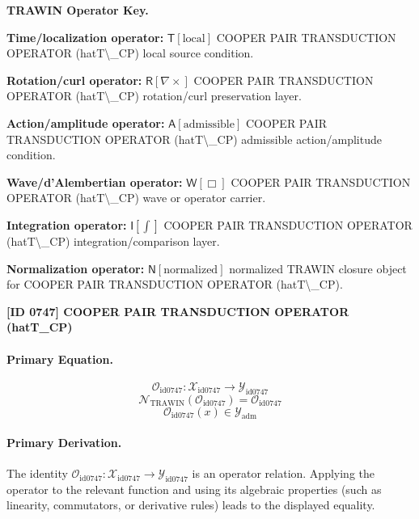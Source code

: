 \par\vspace{0.45\baselineskip}
\noindent\begin{minipage}[t]{\linewidth}
\begingroup
\small
\raggedright
\textbf{TRAWIN Operator Key.}\par
\noindent\textbf{Time/localization operator:} $\mathsf{T}\!\left[\mathrm{local}\right]$ COOPER PAIR TRANSDUCTION OPERATOR (hatT\textbackslash{}\_CP) local source condition.\par
\noindent\textbf{Rotation/curl operator:} $\mathsf{R}\!\left[\nabla\times\right]$ COOPER PAIR TRANSDUCTION OPERATOR (hatT\textbackslash{}\_CP) rotation/curl preservation layer.\par
\noindent\textbf{Action/amplitude operator:} $\mathsf{A}\!\left[\mathrm{admissible}\right]$ COOPER PAIR TRANSDUCTION OPERATOR (hatT\textbackslash{}\_CP) admissible action/amplitude condition.\par
\noindent\textbf{Wave/d'Alembertian operator:} $\mathsf{W}\!\left[\Box\right]$ COOPER PAIR TRANSDUCTION OPERATOR (hatT\textbackslash{}\_CP) wave or operator carrier.\par
\noindent\textbf{Integration operator:} $\mathsf{I}\!\left[\int\right]$ COOPER PAIR TRANSDUCTION OPERATOR (hatT\textbackslash{}\_CP) integration/comparison layer.\par
\noindent\textbf{Normalization operator:} $\mathsf{N}\!\left[\mathrm{normalized}\right]$ normalized TRAWIN closure object for COOPER PAIR TRANSDUCTION OPERATOR (hatT\textbackslash{}\_CP).\par
\endgroup
\end{minipage}

\clearpage
\noindent\textbf{[ID 0747] COOPER PAIR TRANSDUCTION OPERATOR (hatT\_CP)}\par
\vspace{0.35em}
\paragraph{Primary Equation.}
\[
\mathcal{O}_{\mathrm{id0747}}:\mathcal{X}_{\mathrm{id0747}}\longrightarrow\mathcal{Y}_{\mathrm{id0747}}
\]
\[
\mathcal{N}_{\mathrm{TRAWIN}}(\mathcal{O}_{\mathrm{id0747}})=\mathcal{O}_{\mathrm{id0747}}
\]
\[
\mathcal{O}_{\mathrm{id0747}}(x)\in\mathcal{Y}_{\mathrm{adm}}
\]

\paragraph{Primary Derivation.}
The identity \( \mathcal{O}_{\mathrm{id0747}}:\mathcal{X}_{\mathrm{id0747}}\longrightarrow\mathcal{Y}_{\mathrm{id0747}} \) is an operator relation. Applying the operator to the relevant function and using its algebraic properties (such as linearity, commutators, or derivative rules) leads to the displayed equality.
